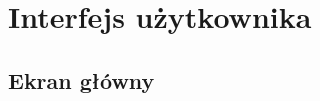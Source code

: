 \documentclass[10pt, titlepage, oneside, a4paper]{article}
\begin{document}
	\section{Interfejs użytkownika}
  
	\subsection{Ekran główny}
	\begin{figure}[!htbp]
  \begin{center}
  {%
		\setlength{\fboxsep}{0.5pt}%
		\setlength{\fboxrule}{0.5pt}%
	}%
  \end{center}
  \end{figure}
	\newpage
\end{document}
